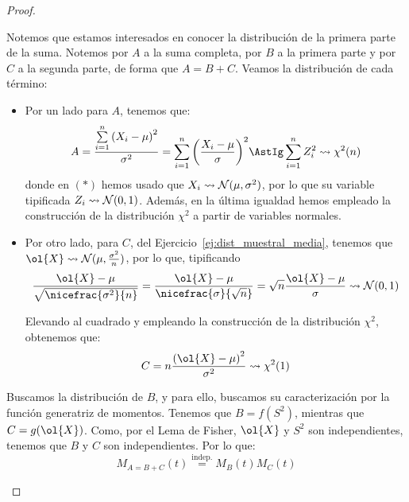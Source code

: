 \begin{coro}
\begin{proof}
\begin{itemize}
            Notemos que estamos interesados en conocer la distribución de la primera parte de la suma. Notemos por $A$ a la suma completa, por $B$ a la primera parte y por $C$ a la segunda parte, de forma que $A=B+C$.            
            Veamos la distribución de cada término:
            \begin{itemize}
                \item Por un lado para $A$, tenemos que:
                \begin{equation*}
                    A = \dfrac{\sum\limits_{i=1}^n {(X_i - \mu)}^{2}}{\sigma^2} =
                    \sum\limits_{i=1}^n {\left(\dfrac{X_i - \mu}{\sigma}\right)}^{2} \AstIg \sum\limits_{i=1}^n Z_i^2 \rightsquigarrow \chi^2(n)
                \end{equation*}
                donde en $(\ast)$ hemos usado que $X_i\rightsquigarrow \mathcal{N}(\mu, \sigma^2)$, por lo que su variable tipificada $Z_i\rightsquigarrow \mathcal{N}(0,1)$. Además, en la última igualdad hemos empleado la construcción de la distribución $\chi^2$ a partir de variables normales.
                \item Por otro lado, para $C$, del Ejercicio~\ref{ej:dist_muestral_media}, tenemos que $\ol{X}\rightsquigarrow \cc{N}(\mu, \frac{\sigma^2}{n})$, por lo que, tipificando 
                \begin{equation*}
                    \dfrac{\ol{X}-\mu}{\sqrt{\nicefrac{\sigma^2}{n}}} = \dfrac{\ol{X}-\mu}{\nicefrac{\sigma}{\sqrt{n}}}=\sqrt{n}\dfrac{\ol{X}-\mu}{\sigma} \rightsquigarrow \cc{N}(0,1)
                \end{equation*}

                Elevando al cuadrado y empleando la construcción de la distribución $\chi^2$, obtenemos que:
                \begin{equation*}
                    C = n\dfrac{{(\ol{X}-\mu)}^{2}}{\sigma^2} \rightsquigarrow \chi^2(1)
                \end{equation*}
            \end{itemize}

            Buscamos la distribución de $B$, y para ello, buscamos su caracterización por la función generatriz de momentos. Tenemos que $B=f(S^2)$, mientras que $C=g(\ol{X})$. Como, por el Lema de Fisher, $\ol{X}$ y $S^2$ son independientes, tenemos que $B$ y $C$ son independientes. Por lo que:
            \begin{equation*}
                M_{A=B+C}(t) \stackrel{\text{indep.}}{=} M_B(t) M_C(t)
            \end{equation*}


\end{itemize}
\end{proof}
\end{coro}
